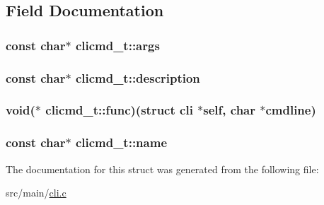 \subsection{Field Documentation}
\hypertarget{structclicmd__t_ad2cda88e44f567b4f1a6d2475204a8fa}{
\subsubsection[{args}]{\setlength{\rightskip}{0pt plus 5cm}const char$\ast$ clicmd\+\_\+t\+::args}}\label{structclicmd__t_ad2cda88e44f567b4f1a6d2475204a8fa}
\hypertarget{structclicmd__t_ae46af4066a493dd85436a03c18f7b46c}{
\subsubsection[{description}]{\setlength{\rightskip}{0pt plus 5cm}const char$\ast$ clicmd\+\_\+t\+::description}}\label{structclicmd__t_ae46af4066a493dd85436a03c18f7b46c}
\hypertarget{structclicmd__t_a2fc41c1a1f4f294b674953d5c7e5edca}{
\subsubsection[{func}]{\setlength{\rightskip}{0pt plus 5cm}void($\ast$ clicmd\+\_\+t\+::func)(struct {\bf cli} $\ast$self, char $\ast$cmdline)}}\label{structclicmd__t_a2fc41c1a1f4f294b674953d5c7e5edca}
\hypertarget{structclicmd__t_a787f10043adc684a59031813850935a7}{
\subsubsection[{name}]{\setlength{\rightskip}{0pt plus 5cm}const char$\ast$ clicmd\+\_\+t\+::name}}\label{structclicmd__t_a787f10043adc684a59031813850935a7}


The documentation for this struct was generated from the following file\+:\begin{DoxyCompactItemize}
\item 
src/main/\hyperlink{cli_8c}{cli.\+c}\end{DoxyCompactItemize}
